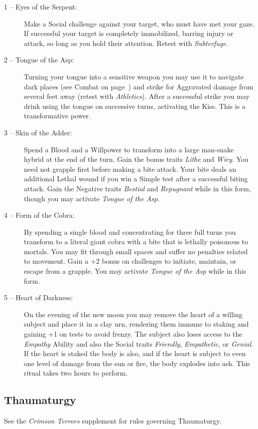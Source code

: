 \begin{description}
	\item[1 -- Eyes of the Serpent:]  Make a Social challenge against your target, who must have met your 
	gaze.  If successful your target is completely immobilized, barring injury or attack, so long as you hold 
	their attention.  Retest with \emph{Subterfuge}.
	\item[2 -- Tongue of the Asp:]  Turning your tongue into a sensitive weapon you may use it to navigate dark 
	places (see Combat on page~\pageref{sec:combat}) and strike for Aggravated damage from several feet away 
	(retest with \emph{Athletics}).  After a successful strike you may drink using the tongue on successive turns, 
	activating the Kiss.  This is a transformative power.
	\item[3 -- Skin of the Adder:]  Spend a Blood and a Willpower to transform into a large man-snake hybrid at 
	the end of the turn.  Gain the bonus traits \emph{Lithe} and \emph{Wiry}.  You need not grapple first before 
	making a bite attack.  Your bite deals an additional Lethal wound if you win a Simple test after a 
	successful biting attack.  Gain the Negative traits  \emph{Bestial} and \emph{Repugnant} while in this form, 
	though you may activate \emph{Tongue of the Asp}.
	\item[4 -- Form of the Cobra:]  By spending a single blood and concentrating for three full turns you 
	transform to a literal giant cobra with a bite that is lethally poisonous to mortals.  You may fit 
	through small spaces and suffer no penalties related to movement.  Gain a +2 bonus on challenges to 
	initiate, maintain, or escape from a grapple.  You may activate \emph{Tongue of the Asp} while in this form.
	\item[5 -- Heart of Darkness:]  On the evening of the new moon you may remove the heart of a willing 
	subject and place it in a clay urn, rendering them immune to staking and gaining +1 on tests to avoid 
	frenzy.  The subject also loses access to the \emph{Empathy} Ability and also the Social traits \emph{Friendly}, 
	\emph{Empathetic}, or \emph{Genial}.  If the heart is staked the body is also, and if the heart is subject 
	to even one level of damage from the sun or fire, the body explodes into ash.  This ritual takes two hours 
	to perform.
\end{description}

\subsection{Thaumaturgy}
See the \emph{Crimson Terrors} supplement for rules governing Thaumaturgy.

